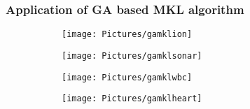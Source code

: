 \documentclass{beamer}
\begin{document}
	\begin{frame}
		\frametitle{Application of GA based MKL algorithm}
		\begin{minipage}{0.45\textwidth}
			\begin{figure}[!ht]
				\begin{subfigure}{0.48\textwidth}
					\texttt{[image: Pictures/gamklion]}	
				\end{subfigure}
				\begin{subfigure}{0.48\textwidth}
					\texttt{[image: Pictures/gamklsonar]}	
				\end{subfigure}
				\medskip
				\begin{subfigure}{0.48\textwidth}
					\texttt{[image: Pictures/gamklwbc]}	
				\end{subfigure}
				\begin{subfigure}{0.48\textwidth}
					\texttt{[image: Pictures/gamklheart]}	
				\end{subfigure}
			\end{figure}
		\end{minipage}
		\begin{minipage}{0.45\textwidth}
			\begin{table}[!ht]
			\centering
\end{table}
\end{minipage}
\end{frame}
\end{document}
